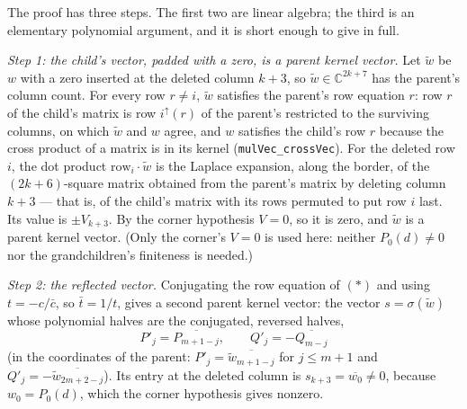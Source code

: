 \documentclass[11pt]{article}
\theoremstyle{definition}
\theoremstyle{remark}
\begin{document}
The proof has three steps. The first two are linear algebra; the third is an elementary polynomial
argument, and it is short enough to give in full.

\emph{Step 1: the child's vector, padded with a zero, is a parent kernel vector.} Let \(\tilde w\) be \(w\) with a
zero inserted at the deleted column \(k+3\), so \(\tilde w \in \mathbb{C}^{2k+7}\) has the parent's column
count. For every row \(r \ne i\), \(\tilde w\) satisfies the parent's row equation \(r\): row \(r\) of the child's
matrix is row \(i^{\uparrow}(r)\) of the parent's restricted to the surviving columns, on which \(\tilde w\) and
\(w\) agree, and \(w\) satisfies the child's row \(r\) because the cross product of a matrix is in its kernel
(\texttt{mulVec\_\allowbreak crossVec}). For the deleted row
\(i\), the dot product \(\text{row}_i \cdot \tilde w\) is the Laplace expansion, along the border, of the
\((2k+6)\)-square matrix obtained from the parent's matrix by deleting column \(k+3\) --- that is, of the child's
matrix with its rows permuted to put row \(i\) last. Its value is \(\pm V_{k+3}\). By the corner hypothesis
\(V = 0\), so it is zero, and \(\tilde w\) is a parent kernel vector. (Only the corner's \(V = 0\) is used here: neither \(P_0(d) \ne 0\)
nor the grandchildren's finiteness is needed.)

\emph{Step 2: the reflected vector.} Conjugating the row equation of \((\ast)\) and using \(t = -c/\bar c\), so
\(\bar t = 1/t\), gives a second parent kernel vector: the vector \(s = \sigma(\tilde w)\) whose polynomial
halves are the conjugated, reversed halves,
\[ P'_j = \overline{P_{m+1-j}}, \qquad Q'_j = -\overline{Q_{m-j}} \]
(in the coordinates of the parent: \(P'_j = \overline{\tilde w_{m+1-j}}\) for \(j \le m+1\) and
\(Q'_j = -\overline{\tilde w_{2m+2-j}}\)). Its entry at the deleted column is \(s_{k+3} = \overline{w_0} \ne 0\),
because \(w_0 = P_0(d)\), which the corner hypothesis gives nonzero.
\end{document}
